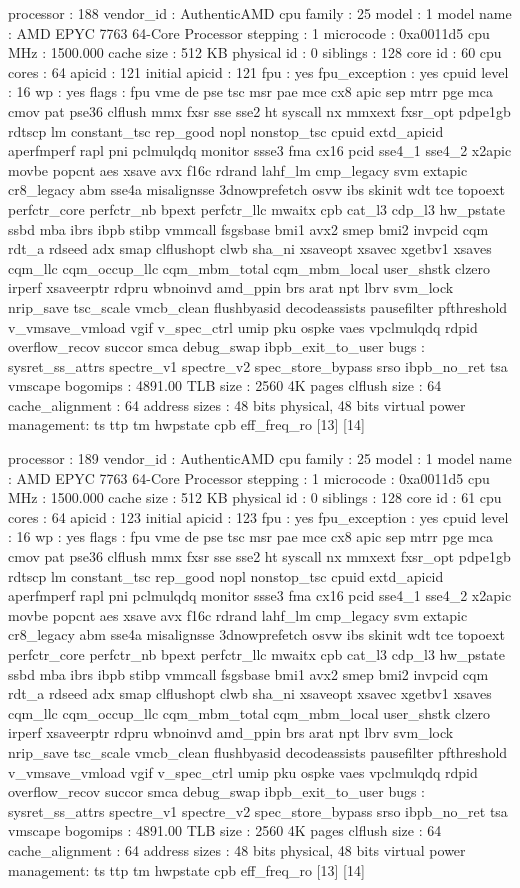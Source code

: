 processor	: 188
vendor_id	: AuthenticAMD
cpu family	: 25
model		: 1
model name	: AMD EPYC 7763 64-Core Processor
stepping	: 1
microcode	: 0xa0011d5
cpu MHz		: 1500.000
cache size	: 512 KB
physical id	: 0
siblings	: 128
core id		: 60
cpu cores	: 64
apicid		: 121
initial apicid	: 121
fpu		: yes
fpu_exception	: yes
cpuid level	: 16
wp		: yes
flags		: fpu vme de pse tsc msr pae mce cx8 apic sep mtrr pge mca cmov pat pse36 clflush mmx fxsr sse sse2 ht syscall nx mmxext fxsr_opt pdpe1gb rdtscp lm constant_tsc rep_good nopl nonstop_tsc cpuid extd_apicid aperfmperf rapl pni pclmulqdq monitor ssse3 fma cx16 pcid sse4_1 sse4_2 x2apic movbe popcnt aes xsave avx f16c rdrand lahf_lm cmp_legacy svm extapic cr8_legacy abm sse4a misalignsse 3dnowprefetch osvw ibs skinit wdt tce topoext perfctr_core perfctr_nb bpext perfctr_llc mwaitx cpb cat_l3 cdp_l3 hw_pstate ssbd mba ibrs ibpb stibp vmmcall fsgsbase bmi1 avx2 smep bmi2 invpcid cqm rdt_a rdseed adx smap clflushopt clwb sha_ni xsaveopt xsavec xgetbv1 xsaves cqm_llc cqm_occup_llc cqm_mbm_total cqm_mbm_local user_shstk clzero irperf xsaveerptr rdpru wbnoinvd amd_ppin brs arat npt lbrv svm_lock nrip_save tsc_scale vmcb_clean flushbyasid decodeassists pausefilter pfthreshold v_vmsave_vmload vgif v_spec_ctrl umip pku ospke vaes vpclmulqdq rdpid overflow_recov succor smca debug_swap ibpb_exit_to_user
bugs		: sysret_ss_attrs spectre_v1 spectre_v2 spec_store_bypass srso ibpb_no_ret tsa vmscape
bogomips	: 4891.00
TLB size	: 2560 4K pages
clflush size	: 64
cache_alignment	: 64
address sizes	: 48 bits physical, 48 bits virtual
power management: ts ttp tm hwpstate cpb eff_freq_ro [13] [14]

processor	: 189
vendor_id	: AuthenticAMD
cpu family	: 25
model		: 1
model name	: AMD EPYC 7763 64-Core Processor
stepping	: 1
microcode	: 0xa0011d5
cpu MHz		: 1500.000
cache size	: 512 KB
physical id	: 0
siblings	: 128
core id		: 61
cpu cores	: 64
apicid		: 123
initial apicid	: 123
fpu		: yes
fpu_exception	: yes
cpuid level	: 16
wp		: yes
flags		: fpu vme de pse tsc msr pae mce cx8 apic sep mtrr pge mca cmov pat pse36 clflush mmx fxsr sse sse2 ht syscall nx mmxext fxsr_opt pdpe1gb rdtscp lm constant_tsc rep_good nopl nonstop_tsc cpuid extd_apicid aperfmperf rapl pni pclmulqdq monitor ssse3 fma cx16 pcid sse4_1 sse4_2 x2apic movbe popcnt aes xsave avx f16c rdrand lahf_lm cmp_legacy svm extapic cr8_legacy abm sse4a misalignsse 3dnowprefetch osvw ibs skinit wdt tce topoext perfctr_core perfctr_nb bpext perfctr_llc mwaitx cpb cat_l3 cdp_l3 hw_pstate ssbd mba ibrs ibpb stibp vmmcall fsgsbase bmi1 avx2 smep bmi2 invpcid cqm rdt_a rdseed adx smap clflushopt clwb sha_ni xsaveopt xsavec xgetbv1 xsaves cqm_llc cqm_occup_llc cqm_mbm_total cqm_mbm_local user_shstk clzero irperf xsaveerptr rdpru wbnoinvd amd_ppin brs arat npt lbrv svm_lock nrip_save tsc_scale vmcb_clean flushbyasid decodeassists pausefilter pfthreshold v_vmsave_vmload vgif v_spec_ctrl umip pku ospke vaes vpclmulqdq rdpid overflow_recov succor smca debug_swap ibpb_exit_to_user
bugs		: sysret_ss_attrs spectre_v1 spectre_v2 spec_store_bypass srso ibpb_no_ret tsa vmscape
bogomips	: 4891.00
TLB size	: 2560 4K pages
clflush size	: 64
cache_alignment	: 64
address sizes	: 48 bits physical, 48 bits virtual
power management: ts ttp tm hwpstate cpb eff_freq_ro [13] [14]

